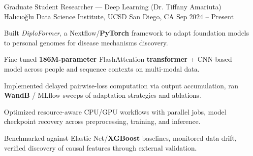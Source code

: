 \documentclass[11pt, a4paper]{awesome-cv}
\begin{document}
\begin{cventries}


  \cventry
    {Graduate Student Researcher — Deep Learning (Dr. Tiffany Amariuta)}
    {Halıcıoğlu Data Science Institute, UCSD}
    {San Diego, CA}
    {Sep 2024 -- Present}
    {
      \begin{cvitems}
        \item {Built \textit{DiploFormer}, a Nextflow/\textbf{PyTorch} framework to adapt foundation models to personal genomes for disease mechanisms discovery.}
        \item {Fine-tuned \textbf{186M-parameter} FlashAttention \textbf{transformer} + CNN-based model across people and sequence contexts on multi-modal data.}
        \item {Implemented delayed pairwise-loss computation via output accumulation, ran \textbf{WandB} / MLflow sweeps of adaptation strategies and ablations.}
        \item {Optimized resource-aware CPU/GPU workflows with parallel jobs, model checkpoint recovery across preprocessing, training, and inference.}
        \item {Benchmarked against Elastic Net/\textbf{XGBoost} baselines, monitored data drift, verified discovery of causal features through external validation.}
      \end{cvitems}
    }


\end{cventries}
\end{document}
